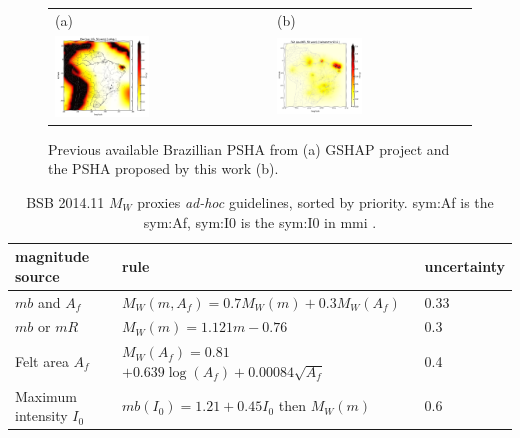 \documentclass[draft, grl]{agutex}
\begin{document}
\begin{figure}
	\begin{center}
	\begin{table}[H]
		\begin{tabular}{ p{} p{} }
		\footnotesize(a)
		&
		\footnotesize(b)
		\\
		\includegraphics[width=0.45\textwidth]{z_img_pga_gshap} &
		\includegraphics[width=0.45\textwidth]{z_img_pga_helmstetter}
		\end{tabular}
	\end{table}
	\caption{Previous available Brazillian PSHA from (a) GSHAP project and the PSHA proposed by this work (b). }
	\label{placeholder}
	\end{center}
\end{figure}



\begin{table}[H]
	\caption{BSB 2014.11 $M_W$ proxies \emph{ad-hoc} guidelines, sorted by priority. \gls{sym:Af} is the \glsdesc{sym:Af}, \gls{sym:I0} is the \glsdesc{sym:I0} in \gls{mmi} \citep{wood_1931}.}
	\begin{tabular}{l l l}
		\hline
		\textbf{magnitude source} & \textbf{rule} & \textbf{uncertainty}\\
		\hline
		$mb$ and $A_f$
		& $M_W(m, A_f) = 0.7 M_W(m) + 0.3 M_W(A_f)$
		& 0.33 \\
		$mb$ or $mR$
		&$ M_W(m) = 1.121 m - 0.76 $
		& 0.3 \\
		Felt area $A_f$
		&$ M_W(A_f) = 0.81 $$    + 0.639\log(A_f) + 0.00084\sqrt{A_f}$& 0.4 \\
		Maximum intensity $I_0$
		& $mb(I_0) = 1.21 + 0.45 I_0$ then $M_W(m)$
		& 0.6 \\
		\hline
	\end{tabular}
	\label{tab:guidelines}
\end{table}
\end{document}
